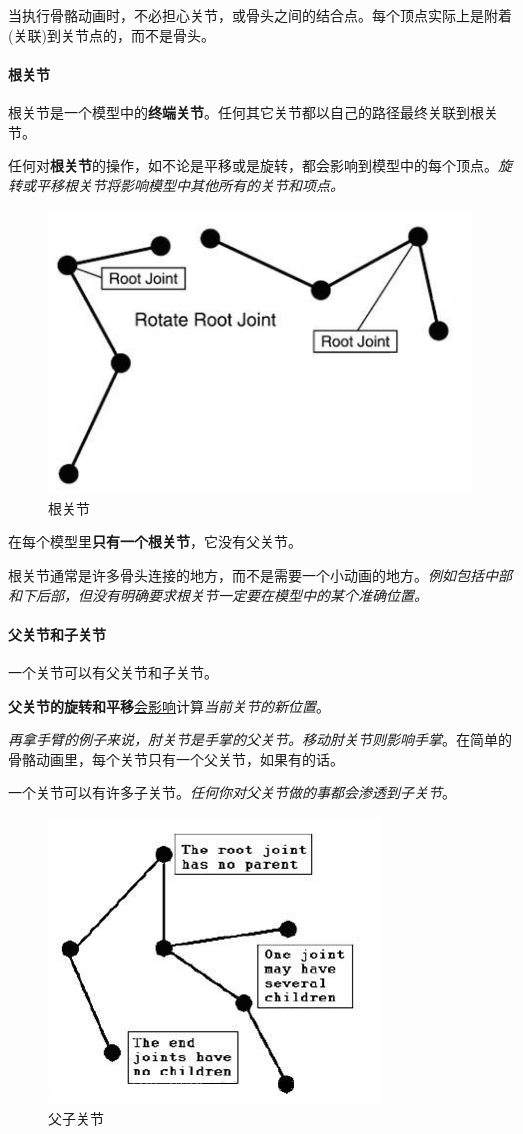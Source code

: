 \documentclass[UTF8,a4paper,12pt]{ctexbook}
\begin{document}
				当执行骨骼动画时，不必担心关节，或骨头之间的结合点。每个顶点实际上是附着(关联)到关节点的，而不是骨头。
			
			\paragraph{根关节}
				根关节是一个模型中的\textbf{终端关节}。任何其它关节都以自己的路径最终关联到根关节。
				
				任何对\textbf{根关节}的操作，如不论是平移或是旋转，都会影响到模型中的每个顶点。\textit{旋转或平移根关节将影响模型中其他所有的关节和项点。}
				
					\begin{figure}[H]
						\centering
						\includegraphics[width=.6\linewidth]{SkeletonTheory02}
						\caption{根关节}
					\end{figure}
				
				在每个模型里\textbf{只有一个根关节}，它没有父关节。
				
				根关节通常是许多骨头连接的地方，而不是需要一个小动画的地方。\textit{例如包括中部和下后部，但没有明确要求根关节一定要在模型中的某个准确位置。}
			
			\paragraph{父关节和子关节}
				一个关节可以有父关节和子关节。
				
				\textbf{父关节的旋转和平移}\underline{会影响}计算\textit{当前关节的新位置}。
				
				\textit{再拿手臂的例子来说，肘关节是手掌的父关节。移动肘关节则影响手掌}。在简单的骨骼动画里，每个关节只有一个父关节，如果有的话。
			
				一个关节可以有许多子关节。\textit{任何你对父关节做的事都会渗透到子关节}。
				
					\begin{figure}[H]
						\centering
						\includegraphics[width=.6\linewidth]{SkeletonTheory03}
						\caption{父子关节}
					\end{figure}				
				
\end{document}
